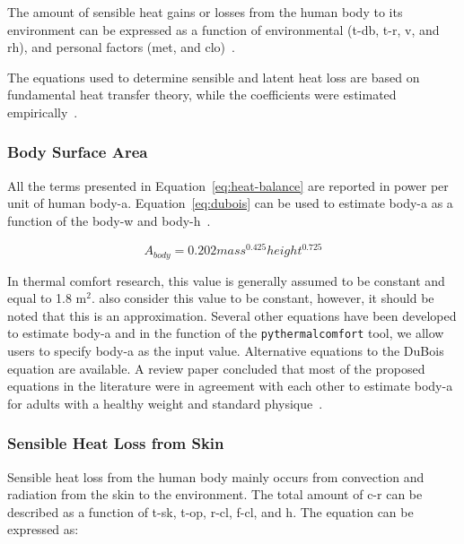 The amount of sensible heat gains or losses from the human body to its environment can be expressed as a function of environmental (\ac{t-db}, \ac{t-r}, \ac{v}, and \ac{rh}), and personal factors (\ac{met}, and \ac{clo})~\cite{ASHRA2017}.

The equations used to determine sensible and latent heat loss are based on fundamental heat transfer theory, while the coefficients were estimated empirically~\cite{ASHRA2017}.

\subsubsection{Body Surface Area}

All the terms presented in Equation~\ref{eq:heat-balance} are reported in power per unit of human \ac{body-a}.
Equation~\ref{eq:dubois} can be used to estimate \ac{body-a} as a function of the \ac{body-w} and \ac{body-h}~\cite{DuBois}.

\begin{equation}
    A_{body} = 0.202 mass^{0.425} height^{0.725}\label{eq:dubois}
\end{equation}

In thermal comfort research, this value is generally assumed to be constant and equal to 1.8 m$^{2}$.
 also consider this value to be constant, however, it should be noted that this is an approximation.
Several other equations have been developed to estimate \ac{body-a} and in the function of the \verb|pythermalcomfort| tool, we allow users to specify \ac{body-a} as the input value.
Alternative equations to the DuBois equation are available.
A review paper concluded that most of the proposed equations in the literature were in agreement with each other to estimate \ac{body-a} for adults with a healthy weight and standard physique~\cite{Redlarski2016}.

\subsubsection{Sensible Heat Loss from Skin}

Sensible heat loss from the human body mainly occurs from convection and radiation from the skin to the environment.
The total amount of \ac{c-r} can be described as a function of \ac{t-sk}, \ac{t-op}, \ac{r-cl}, \ac{f-cl}, and \ac{h}.
The equation can be expressed as:

